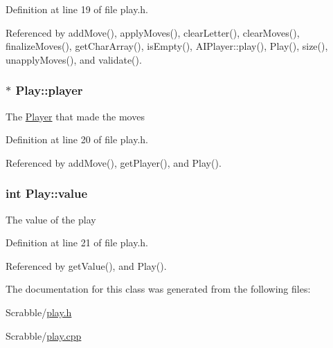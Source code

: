 Definition at line 19 of file play.\-h.



Referenced by add\-Move(), apply\-Moves(), clear\-Letter(), clear\-Moves(), finalize\-Moves(), get\-Char\-Array(), is\-Empty(), A\-I\-Player\-::play(), Play(), size(), unapply\-Moves(), and validate().

\hypertarget{class_play_a8a7094a8a0186212896fe7daf71617a3}{
\subsubsection[{player}]{$\ast$ Play\-::player\hspace{0.3cm}{\ttfamily [private]}}}\label{class_play_a8a7094a8a0186212896fe7daf71617a3}
The \hyperlink{class_player}{Player} that made the moves 

Definition at line 20 of file play.\-h.



Referenced by add\-Move(), get\-Player(), and Play().

\hypertarget{class_play_abc8cb0f8fb660091fee8563b5a917ad7}{
\subsubsection[{value}]{\setlength{\rightskip}{0pt plus 5cm}int Play\-::value\hspace{0.3cm}{\ttfamily [private]}}}\label{class_play_abc8cb0f8fb660091fee8563b5a917ad7}
The value of the play 

Definition at line 21 of file play.\-h.



Referenced by get\-Value(), and Play().



The documentation for this class was generated from the following files\-:\begin{DoxyCompactItemize}
\item 
Scrabble/\hyperlink{play_8h}{play.\-h}\item 
Scrabble/\hyperlink{play_8cpp}{play.\-cpp}\end{DoxyCompactItemize}
